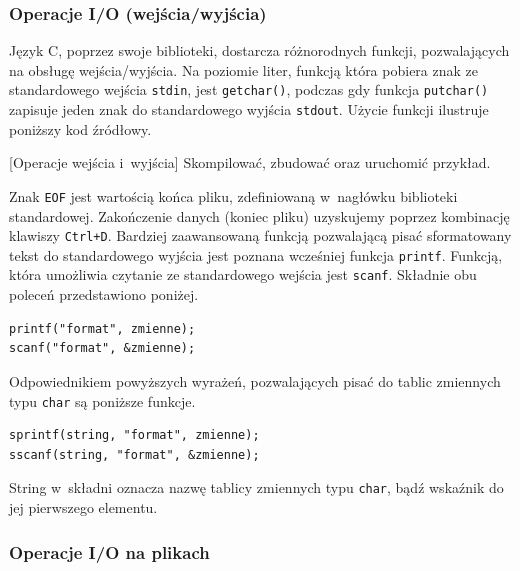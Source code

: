 \subsubsection{Operacje I/O (wejścia/wyjścia)}

Język C, poprzez swoje biblioteki, dostarcza różnorodnych funkcji, pozwalających na obsługę wejścia/wyjścia. Na poziomie liter, funkcją która pobiera znak ze standardowego wejścia \lstinline[style=MyCStyle]{stdin}, jest \lstinline[style=MyCStyle]{getchar()}, podczas gdy funkcja \lstinline[style=MyCStyle]{putchar()} zapisuje jeden znak do standardowego wyjścia \lstinline[style=MyCStyle]{stdout}. Użycie funkcji ilustruje poniższy kod źródłowy.

\begin{example}{[Operacje wejścia i~wyjścia]} Skompilować, zbudować oraz uruchomić przykład. 

\end{example}

Znak \lstinline[style=MyCStyle]{EOF} jest wartością końca pliku, zdefiniowaną w~nagłówku biblioteki standardowej. Zakończenie danych (koniec pliku) uzyskujemy poprzez kombinację klawiszy \lstinline[style=MyCStyle]{Ctrl+D}. Bardziej zaawansowaną funkcją pozwalającą pisać sformatowany tekst do standardowego wyjścia jest poznana wcześniej funkcja \lstinline[style=MyCStyle]{printf}. Funkcją, która umożliwia czytanie ze standardowego wejścia jest \lstinline[style=MyCStyle,morekeywords={scanf}]{scanf}. Składnie obu poleceń przedstawiono poniżej.

\begin{lstlisting}[style=MyCStyle,morekeywords={scanf}]
printf("format", zmienne);
scanf("format", &zmienne);
\end{lstlisting}

Odpowiednikiem powyższych wyrażeń, pozwalających pisać do tablic zmiennych typu \lstinline[style=MyCStyle]{char} są poniższe funkcje.

\begin{lstlisting}[style=MyCStyle,morekeywords={scanf,sprintf}]
sprintf(string, "format", zmienne);
sscanf(string, "format", &zmienne);
\end{lstlisting}

String w~składni oznacza nazwę tablicy zmiennych typu \lstinline[style=MyCStyle]{char}, bądź wskaźnik do jej pierwszego elementu.

\subsubsection{Operacje I/O na plikach}

